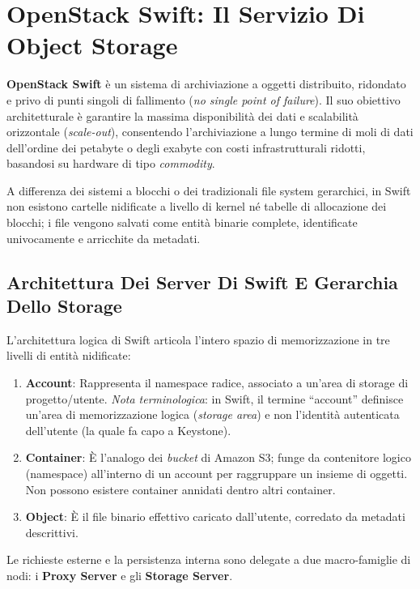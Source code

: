 \documentclass[11pt, a4paper]{article}
\begin{document}
\newpage

\section{OpenStack Swift: Il Servizio Di Object Storage}

\textbf{OpenStack Swift} è un sistema di archiviazione a oggetti distribuito, ridondato e privo di punti singoli di fallimento (\emph{no single point of failure}). Il suo obiettivo architetturale è garantire la massima disponibilità dei dati e scalabilità orizzontale (\emph{scale-out}), consentendo l'archiviazione a lungo termine di moli di dati dell'ordine dei petabyte o degli exabyte con costi infrastrutturali ridotti, basandosi su hardware di tipo \emph{commodity}.

A differenza dei sistemi a blocchi o dei tradizionali file system gerarchici, in Swift non esistono cartelle nidificate a livello di kernel né tabelle di allocazione dei blocchi; i file vengono salvati come entità binarie complete, identificate univocamente e arricchite da metadati.

\subsection{Architettura Dei Server Di Swift E Gerarchia Dello Storage}

L'architettura logica di Swift articola l'intero spazio di memorizzazione in tre livelli di entità nidificate:
\begin{enumerate}[noitemsep]
    \item \textbf{Account}: Rappresenta il namespace radice, associato a un'area di storage di progetto/utente. \emph{Nota terminologica}: in Swift, il termine ``account'' definisce un'area di memorizzazione logica (\emph{storage area}) e non l'identità autenticata dell'utente (la quale fa capo a Keystone).
    \item \textbf{Container}: È l'analogo dei \emph{bucket} di Amazon S3; funge da contenitore logico (namespace) all'interno di un account per raggruppare un insieme di oggetti. Non possono esistere container annidati dentro altri container.
    \item \textbf{Object}: È il file binario effettivo caricato dall'utente, corredato da metadati descrittivi.
\end{enumerate}

Le richieste esterne e la persistenza interna sono delegate a due macro-famiglie di nodi: i \textbf{Proxy Server} e gli \textbf{Storage Server}.
\end{document}
